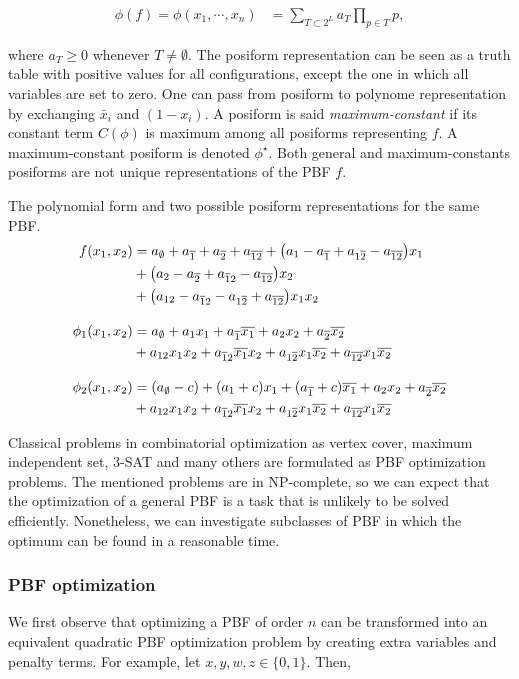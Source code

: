 \begin{align}
	\phi(f) = \phi(x_1,\cdots,x_n) &= \sum_{T \subset 2^{L}}a_T{\prod_{p \in T}{p}},
\end{align}

where $a_T \geq 0$ whenever $T\neq \emptyset$. The posiform representation can be seen as a truth table with positive values for all configurations, except the one in which all variables are set to zero. One can pass from posiform to polynome representation by exchanging $\bar{x}_i$ and $(1-x_i)$. A posiform is said \emph{maximum-constant}  if its constant term $C(\phi)$ is maximum among all posiforms representing $f$. A maximum-constant posiform is denoted $\phi^{\star}$. Both general and maximum-constants posiforms are not unique representations of the PBF $f$.

\begin{example}The polynomial form and two possible posiform representations for the same PBF.
\begin{align*}
	f(x_1,x_2) &= a_{\emptyset} + a_{\overline{1}} + a_{\overline{2}} + a_{\overline{12}} + \big(a_1 - a_{\overline{1}} + a_{1{\overline{2}}} - a_{\overline{12}}\big)x_1 \\
	&+ \big(a_{2} - a_{\overline{2}} + a_{{\overline{1}}2} - a_{{\overline{12}}}\big)x_2\\ 
	&+ \big(a_{12} - a_{{\overline{1}}2} - a_{1{\overline{2}}} + a_{{\overline{12}}}\big)x_1x_2 \\[1em]
	\phi_1(x_1,x_2) &= a_{\emptyset} + a_1x_1 + a_{\overline{1}}{\overline{x_1}} + a_2x_2 + a_{\overline{2}}{\overline{x_2}} \\ 
			&+ a_{12}x_1x_2 + a_{{\overline{1}}2}{\overline{x_1}}x_2 + a_{1{\overline{2}}}x_1{\overline{x_2}} + a_{{\overline{12}}}x_1{\overline{x_2}} \\[1em]			
	\phi_2(x_1,x_2) &= (a_{\emptyset}-c) + (a_1+c)x_1 + (a_{\overline{1}}+c){\overline{x_1}} + a_2x_2 + a_{\overline{2}}{\overline{x_2}} \\ 
			&+ a_{12}x_1x_2 + a_{{\overline{1}}2}{\overline{x_1}}x_2 + a_{1{\overline{2}}}x_1{\overline{x_2}} + a_{{\overline{12}}}x_1{\overline{x_2}} 	
\end{align*}
\end{example}

Classical problems in combinatorial optimization as vertex cover, maximum independent set, $3$-SAT and many others are formulated as PBF optimization problems. The mentioned problems are in NP-complete, so we can expect that the optimization of a general PBF is a task that is unlikely to be solved efficiently. Nonetheless, we can investigate subclasses of PBF in which the optimum can be found in a reasonable time.

\subsubsection{PBF optimization}
 We first observe that optimizing a PBF of order $n$ can be transformed into an equivalent quadratic PBF optimization problem by creating extra variables and penalty terms. For example, let $x,y,w,z \in \{0,1\}$. Then,
 
